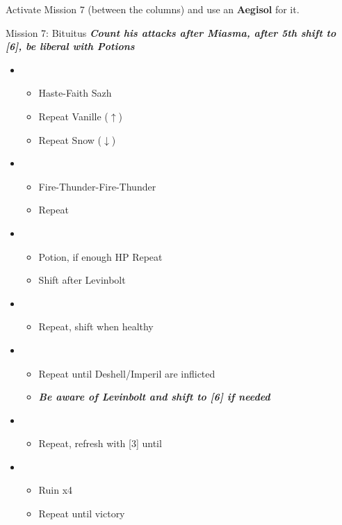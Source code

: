 Activate Mission 7 (between the columns) and use an \textbf{Aegisol} for it.
\vfill
\begin{battle}{Mission 7: Bituitus}
	\textit{\textbf{Count his attacks after Miasma, after 5th shift to [6], be liberal with Potions}}
	\begin{itemize}
		\item \first
			\begin{itemize}
				\item Haste-Faith Sazh
				\item Repeat Vanille ($\uparrow$)
				\item Repeat Snow ($\downarrow$)
			\end{itemize}
		\item \fourth
			\begin{itemize}
				\item Fire-Thunder-Fire-Thunder
				\item Repeat
			\end{itemize}
		\item \sixth
			\begin{itemize}
				\item Potion, if enough HP Repeat
				\item Shift after Levinbolt
			\end{itemize}
		\item \third
			\begin{itemize}
				\item Repeat, shift when healthy
			\end{itemize}
		\item \fourth
			\begin{itemize}
				\item Repeat until Deshell/Imperil are inflicted
				\item \textit{\textbf{Be aware of Levinbolt and shift to [6] if needed}}
			\end{itemize}
		\item \second
			\begin{itemize}
				\item Repeat, refresh with [3] until \stagger
			\end{itemize}
		\item \fifth
			\begin{itemize}
				\item Ruin x4
				\item Repeat until victory
			\end{itemize}
	\end{itemize}
\end{battle}

